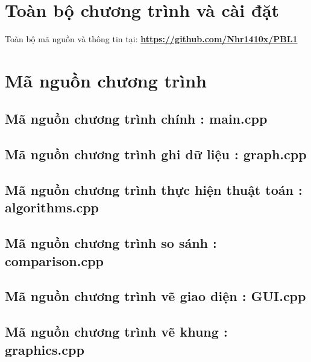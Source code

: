 \documentclass[14pt,a4paper]{report}
\begin{document}
\section{Toàn bộ chương trình và cài đặt}
\begin{tcolorbox}[
    colback=white!5,        
    colframe=black!80!white,
    title=\textbf{\faGithub \ Link GitHub}, 
    arc=4pt,               
    outer arc=4pt,
    boxrule=1pt,            
    halign=center           
]
    Toàn bộ mã nguồn và thông tin tại: 
    \href{https://github.com/Nhr1410x/PBL1}{\textbf{\color{red}https://github.com/Nhr1410x/PBL1}}
\end{tcolorbox}

\section{Mã nguồn chương trình}

\subsection{Mã nguồn chương trình chính : main.cpp}


\subsection{Mã nguồn chương trình ghi dữ liệu : graph.cpp}


\subsection{Mã nguồn chương trình thực hiện thuật toán : algorithms.cpp}


\subsection{Mã nguồn chương trình so sánh : comparison.cpp}


\subsection{Mã nguồn chương trình vẽ giao diện : GUI.cpp}


\subsection{Mã nguồn chương trình vẽ khung : graphics.cpp}

\end{document}
